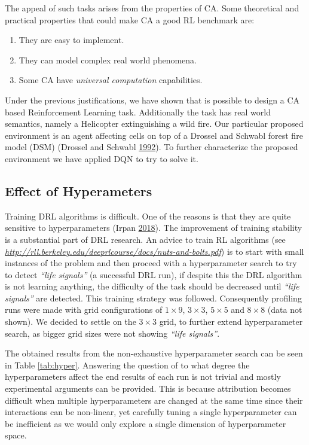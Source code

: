 \documentclass[
  openany]{book}
\providecommand{\tightlist}{%
  \setlength{\itemsep}{0pt}\setlength{\parskip}{0pt}}
\begin{document}
The appeal of such tasks arises from the properties of CA. Some theoretical and practical properties that could make CA a good RL benchmark are:

\begin{enumerate}
\def\labelenumi{\arabic{enumi}.}
\tightlist
\item
  They are easy to implement.
\item
  They can model complex real world phenomena.
\item
  Some CA have \emph{universal computation} capabilities.
\end{enumerate}

Under the previous justifications, we have shown that is possible to design a CA based Reinforcement Learning task. Additionally the task has real world semantics, namely a Helicopter extinguishing a wild fire. Our particular proposed environment is an agent affecting cells on top of a Drossel and Schwabl forest fire model (DSM) (Drossel and Schwabl \protect\hyperlink{ref-drossel1992self}{1992}). To further characterize the proposed environment we have applied DQN to try to solve it.

\hypertarget{effect-of-hyperameters}{%
\subsection{Effect of Hyperameters}\label{effect-of-hyperameters}}

Training DRL algorithms is difficult. One of the reasons is that they are quite sensitive to hyperparameters (Irpan \protect\hyperlink{ref-rlblogpost}{2018}). The improvement of training stability is a substantial part of DRL research. An advice to train RL algorithms (see \emph{\url{http://rll.berkeley.edu/deeprlcourse/docs/nuts-and-bolts.pdf}}) is to start with small instances of the problem and then proceed with a hyperparameter search to try to detect \emph{``life signals''} (a successful DRL run), if despite this the DRL algorithm is not learning anything, the difficulty of the task should be decreased until \emph{``life signals''} are detected. This training strategy was followed. Consequently profiling runs were made with grid configurations of \(1 \times 9\), \(3 \times 3\), \(5 \times 5\) and \(8 \times 8\) (data not shown). We decided to settle on the \(3 \times 3\) grid, to further extend hyperparameter search, as bigger grid sizes were not showing \emph{``life signals''}.

The obtained results from the non-exhaustive hyperparameter search can be seen in Table \ref{tab:hyper}. Answering the question of to what degree the hyperparameters affect the end results of each run is not trivial and mostly experimental arguments can be provided. This is because attribution becomes difficult when multiple hyperparameters are changed at the same time since their interactions can be non-linear, yet carefully tuning a single hyperparameter can be inefficient as we would only explore a single dimension of hyperparameter space.
\end{document}
